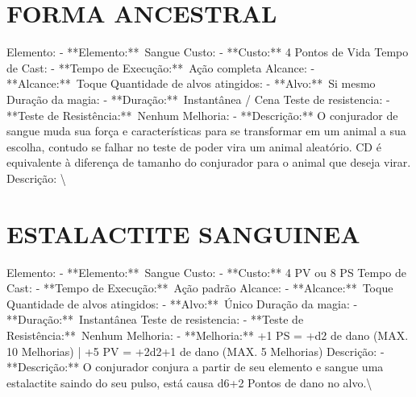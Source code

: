 \documentclass{article}%
\begin{document}
%
\section{FORMA ANCESTRAL}%
\label{sec:FORMAANCESTRAL}%
Elemento: {-} **Elemento:**~Sangue\newline%
Custo: {-} **Custo:** 4 Pontos de Vida\newline%
Tempo de Cast: {-} **Tempo de Execução:**~Ação completa\newline%
Alcance: {-} **Alcance:**~Toque\newline%
Quantidade de alvos atingidos: {-} **Alvo:**~Si mesmo\newline%
Duração da magia: {-} **Duração:**~Instantânea / Cena\newline%
Teste de resistencia: {-} **Teste de Resistência:**~Nenhum\newline%
Melhoria: {-} **Descrição:** O conjurador de sangue muda sua força e características para se transformar em um animal a sua escolha, contudo se falhar no teste de poder vira um animal aleatório. CD é equivalente à diferença de tamanho do conjurador para o animal que deseja virar.\newline%
Descrição: \textbackslash{}

%
\section{ESTALACTITE SANGUINEA}%
\label{sec:ESTALACTITESANGUINEA}%
Elemento: {-} **Elemento:**~Sangue\newline%
Custo: {-} **Custo:** 4 PV ou 8 PS\newline%
Tempo de Cast: {-} **Tempo de Execução:**~Ação padrão\newline%
Alcance: {-} **Alcance:**~Toque\newline%
Quantidade de alvos atingidos: {-} **Alvo:**~Único\newline%
Duração da magia: {-} **Duração:**~Instantânea\newline%
Teste de resistencia: {-} **Teste de Resistência:**~Nenhum\newline%
Melhoria: {-} **Melhoria:** +1 PS = +d2 de dano (MAX. 10 Melhorias) | +5 PV = +2d2+1 de dano (MAX. 5 Melhorias)\newline%
Descrição: {-} **Descrição:** O conjurador conjura a partir de seu elemento e sangue uma estalactite saindo do seu pulso, está causa d6+2 Pontos de dano no alvo.\textbackslash{}

%
\end{document}
